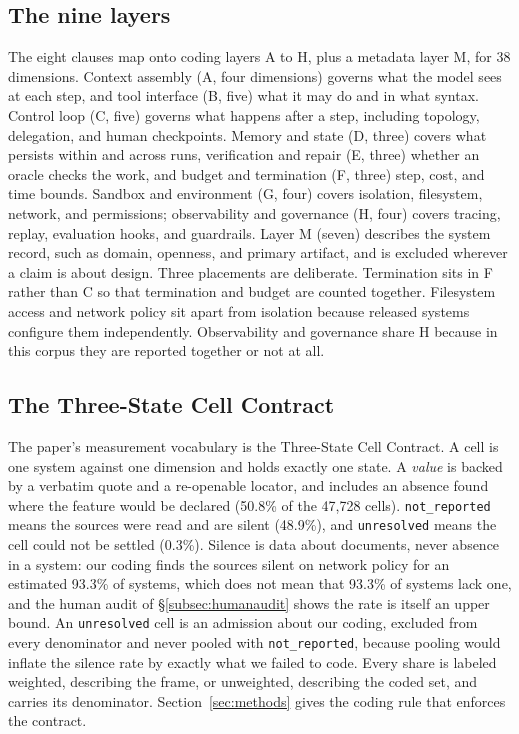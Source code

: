 \subsection{The nine layers}
\label{subsec:layers}

The eight clauses map onto coding layers A to H, plus a metadata layer M, for 38 dimensions.
Context assembly (A, four dimensions) governs what the model sees at each step, and tool interface
(B, five) what it may do and in what syntax. Control loop (C, five) governs what happens after a
step, including topology, delegation, and human checkpoints. Memory and state (D, three) covers what
persists within and across runs, verification and repair (E, three) whether an oracle checks the work,
and budget and termination (F, three) step, cost, and time bounds. Sandbox and environment (G, four)
covers isolation, filesystem, network, and permissions; observability and governance (H, four) covers
tracing, replay, evaluation hooks, and guardrails. Layer M (seven) describes the system record, such
as domain, openness, and primary artifact, and is excluded wherever a claim is about design. Three
placements are deliberate. Termination sits in F rather than C so that termination and budget are
counted together. Filesystem access and network policy sit apart from isolation because released
systems configure them independently. Observability and governance share H because in this corpus
they are reported together or not at all.

\subsection{The Three-State Cell Contract}
\label{subsec:cellstates}

The paper's measurement vocabulary is the Three-State Cell Contract. A cell is one system against one
dimension and holds exactly one state. A \emph{value} is backed by a verbatim quote and a re-openable
locator, and includes an absence found where the feature would be declared (50.8\% of the 47,728
cells). \texttt{not\_reported} means the sources were read and are silent (48.9\%), and
\texttt{unresolved} means the cell could not be settled (0.3\%). Silence is data about documents,
never absence in a system: our coding finds the sources silent on network policy for an estimated
93.3\% of systems, which does not mean that 93.3\% of systems lack one, and the human audit of
\S\ref{subsec:humanaudit} shows the rate is itself an upper bound. An \texttt{unresolved} cell is an
admission about our coding, excluded from every denominator and never pooled with
\texttt{not\_reported}, because pooling would inflate the silence rate by exactly what we failed to
code. Every share is labeled weighted, describing the frame, or unweighted, describing the coded set,
and carries its denominator. Section~\ref{sec:methods} gives the coding rule that enforces the
contract.
